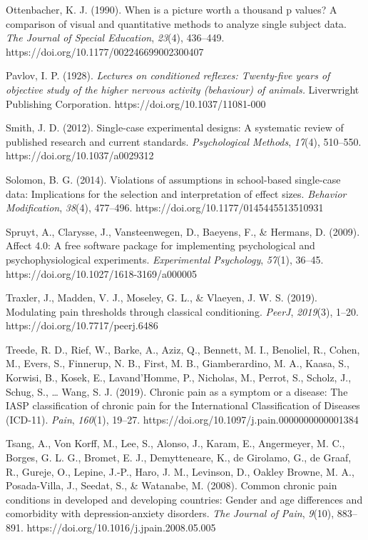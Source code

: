 \documentclass{article}
\begin{document}
Ottenbacher, K. J. (1990). When is a picture worth a thousand p values? A comparison of visual and quantitative methods to analyze single subject data. \emph{The Journal of Special Education}, \emph{23}(4), 436--449. https://doi.org/10.1177/002246699002300407

Pavlov, I. P. (1928). \emph{Lectures on conditioned reflexes: Twenty-five years of objective study of the higher nervous activity (behaviour) of animals.} Liverwright Publishing Corporation. https://doi.org/10.1037/11081-000

Smith, J. D. (2012). Single-case experimental designs: A systematic review of published research and current standards. \emph{Psychological Methods}, \emph{17}(4), 510--550. https://doi.org/10.1037/a0029312

Solomon, B. G. (2014). Violations of assumptions in school-based single-case data: Implications for the selection and interpretation of effect sizes. \emph{Behavior Modification}, \emph{38}(4), 477--496. https://doi.org/10.1177/0145445513510931

Spruyt, A., Clarysse, J., Vansteenwegen, D., Baeyens, F., \& Hermans, D. (2009). Affect 4.0: A free software package for implementing psychological and psychophysiological experiments. \emph{Experimental Psychology}, \emph{57}(1), 36--45. https://doi.org/10.1027/1618-3169/a000005

Traxler, J., Madden, V. J., Moseley, G. L., \& Vlaeyen, J. W. S. (2019). Modulating pain thresholds through classical conditioning. \emph{PeerJ}, \emph{2019}(3), 1--20. https://doi.org/10.7717/peerj.6486

Treede, R. D., Rief, W., Barke, A., Aziz, Q., Bennett, M. I., Benoliel, R., Cohen, M., Evers, S., Finnerup, N. B., First, M. B., Giamberardino, M. A., Kaasa, S., Korwisi, B., Kosek, E., Lavand'Homme, P., Nicholas, M., Perrot, S., Scholz, J., Schug, S., … Wang, S. J. (2019). Chronic pain as a symptom or a disease: The IASP classification of chronic pain for the International Classification of Diseases (ICD-11). \emph{Pain}, \emph{160}(1), 19--27. https://doi.org/10.1097/j.pain.0000000000001384

Tsang, A., Von Korff, M., Lee, S., Alonso, J., Karam, E., Angermeyer, M. C., Borges, G. L. G., Bromet, E. J., Demytteneare, K., de Girolamo, G., de Graaf, R., Gureje, O., Lepine, J.-P., Haro, J. M., Levinson, D., Oakley Browne, M. A., Posada-Villa, J., Seedat, S., \& Watanabe, M. (2008). Common chronic pain conditions in developed and developing countries: Gender and age differences and comorbidity with depression-anxiety disorders. \emph{The Journal of Pain}, \emph{9}(10), 883--891. https://doi.org/10.1016/j.jpain.2008.05.005
\end{document}
